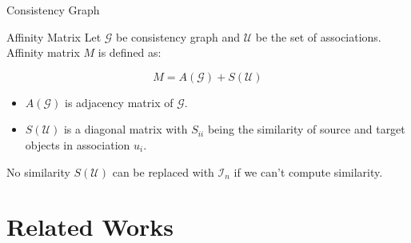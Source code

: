 \documentclass{beamer}
\begin{document}
\begin{frame}{Consistency Graph}
\begin{block}{}
  \end{block}
\end{frame}


\begin{frame}{Affinity Matrix}
  Let $\mathcal{G}$ be consistency graph and $\mathcal{U}$ be the set of associations. Affinity matrix $M$ is defined as:
  \begin{block}{}
    \begin{equation*}
      M = A(\mathcal{G}) + S(\mathcal{U})
    \end{equation*}
  \end{block}

  \begin{itemize}
    \item $A(\mathcal{G})$ is adjacency matrix of $\mathcal{G}$.
    \item $S(\mathcal{U})$ is a diagonal matrix with $S_{ii}$ being the similarity of source and target objects in association $u_i$.
  \end{itemize}


  \begin{alertblock}{No similarity}
    $S(\mathcal{U})$ can be replaced with $\mathcal{I}_n$ if we can't compute similarity.
  \end{alertblock}
\end{frame}


\section{Related Works}
\begin{frame}
  \sectionpage
\end{frame}
\end{document}
